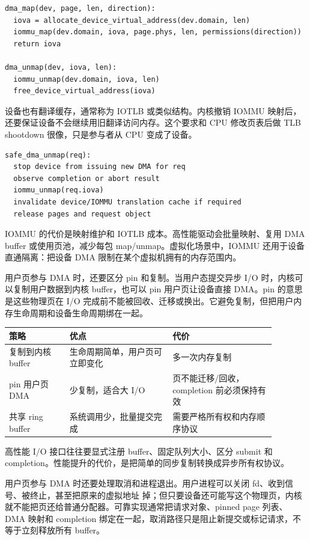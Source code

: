 \begin{lstlisting}
dma_map(dev, page, len, direction):
  iova = allocate_device_virtual_address(dev.domain, len)
  iommu_map(dev.domain, iova, page.phys, len, permissions(direction))
  return iova

dma_unmap(dev, iova, len):
  iommu_unmap(dev.domain, iova, len)
  free_device_virtual_address(iova)
\end{lstlisting}

设备也有翻译缓存，通常称为 IOTLB 或类似结构。内核撤销 IOMMU 映射后，还要保证设备不会继续用旧翻译访问内存。这个要求和 CPU 修改页表后做 TLB shootdown 很像，只是参与者从 CPU 变成了设备。

\begin{lstlisting}
safe_dma_unmap(req):
  stop device from issuing new DMA for req
  observe completion or abort result
  iommu_unmap(req.iova)
  invalidate device/IOMMU translation cache if required
  release pages and request object
\end{lstlisting}

IOMMU 的代价是映射维护和 IOTLB 成本。高性能驱动会批量映射、复用 DMA buffer 或使用页池，减少每包 map/unmap。虚拟化场景中，IOMMU 还用于设备直通隔离：把设备 DMA 限制在某个虚拟机拥有的内存范围内。

用户页参与 DMA 时，还要区分 pin 和复制。当用户态提交异步 I/O 时，内核可以复制用户数据到内核 buffer，也可以 pin 用户页让设备直接 DMA。pin 的意思是这些物理页在 I/O 完成前不能被回收、迁移或换出。它避免复制，但把用户内存生命周期和设备生命周期绑在一起。

\begin{longtable}{p{0.2\linewidth}p{0.34\linewidth}p{0.34\linewidth}}
\toprule
策略 & 优点 & 代价 \\
\midrule
复制到内核 buffer & 生命周期简单，用户页可立即变化 & 多一次内存复制 \\
pin 用户页 DMA & 少复制，适合大 I/O & 页不能迁移/回收，completion 前必须保持有效 \\
共享 ring buffer & 系统调用少，批量提交完成 & 需要严格所有权和内存顺序协议 \\
\bottomrule
\end{longtable}

高性能 I/O 接口往往要显式注册 buffer、固定队列大小、区分 submit 和 completion。性能提升的代价，是把简单的同步复制转换成异步所有权协议。

用户页参与 DMA 时还要处理取消和进程退出。用户进程可以关闭 fd、收到信号、被终止，甚至把原来的虚拟地址  掉；但只要设备还可能写这个物理页，内核就不能把页还给普通分配器。可靠实现通常把请求对象、pinned page 列表、DMA 映射和 completion 绑定在一起，取消路径只是阻止新提交或标记请求，不等于立刻释放所有 buffer。


